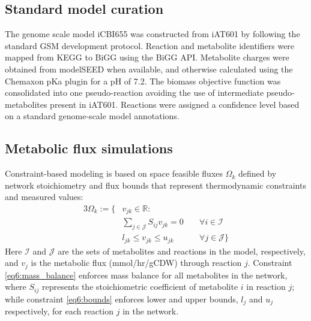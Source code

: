 \subsection{Standard model curation}
The genome scale model iCBI655 was constructed from  iAT601\citep{thompson2016} by following the standard GSM development
protocol.\citep{thiele2010}
Reaction and metabolite identifiers were mapped from KEGG to BiGG using the BiGG API.\citep{king2015}
Metabolite charges were obtained from modelSEED when available, and otherwise calculated using the Chemaxon pKa plugin\citep{szegezdi2007} for a pH of 7.2.\citep{thiele2010}
The biomass objective function was consolidated into one pseudo-reaction avoiding the use of intermediate pseudo-metabolites present in iAT601.
Reactions were assigned a confidence level based on a standard genome-scale model annotations.\citep{thiele2010}

\subsection{Metabolic flux simulations} \label{sec:flux_simulations}
Constraint-based modeling\citep{palsson2015} is based on space feasible fluxes $\Omega_k$ defined by network stoichiometry and flux bounds that represent thermodynamic constraints and measured values:
\begin{alignat}{3}
    \nonumber \Omega_k := \{& v_{jk} \in \mathbb{R}:\\
    & \sum_{j \in \mathcal{J}} S_{ij} v_{jk} = 0 \; && \forall i \in  \mathcal{I} \label{eq6:mass_balance}\\
    & l_{jk} \le v_{jk} \le u_{jk} \; && \forall j \in  \mathcal{J} \} \label{eq6:bounds}
\end{alignat}
Here $\mathcal{I}$ and $\mathcal{J}$ are the sets of metabolites and reactions in the model, respectively, and $v_j$ is the metabolic flux (mmol/hr/gCDW) through reaction $j$. Constraint \eqref{eq6:mass_balance} enforces mass balance for all metabolites in the network, where $S_{ij}$ represents the stoichiometric coefficient of metabolite $i$ in reaction $j$; while constraint \eqref{eq6:bounds} enforces lower and upper bounds, $l_j$ and $u_j$ respectively, for each reaction $j$ in the network.

